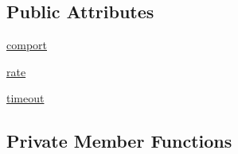 \subsection*{Public Attributes}
\begin{DoxyCompactItemize}
\item 
\mbox{\hyperlink{classtoxic__hardware_1_1roboclaw__3_1_1Roboclaw_af11cdc24a14ee681791b216a58a596a9}{comport}}
\item 
\mbox{\hyperlink{classtoxic__hardware_1_1roboclaw__3_1_1Roboclaw_a1d580470818c2fa51a0bf3a86bc595bf}{rate}}
\item 
\mbox{\hyperlink{classtoxic__hardware_1_1roboclaw__3_1_1Roboclaw_aee145bfca8e9b2eaf3cd3c47157be9a3}{timeout}}
\end{DoxyCompactItemize}
\subsection*{Private Member Functions}
